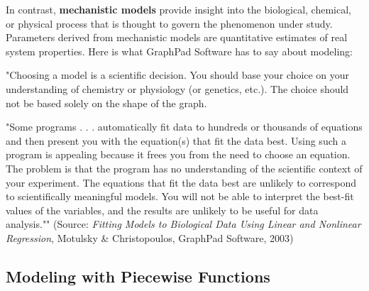 \documentclass[10pt,]{book}
\newcommand{\terminology}[1]{\textbf{#1}}
\theoremstyle{plain}
\theoremstyle{definition}
\theoremstyle{definition}
\theoremstyle{definition}
\theoremstyle{definition}
\theoremstyle{definition}
\numberwithin{equation}{section}
\begin{document}
    In contrast, \terminology{mechanistic models} provide insight into the biological, chemical, or physical process that is thought to govern the phenomenon under study. Parameters derived from mechanistic models are quantitative estimates of real system properties. Here is what GraphPad Software has to say about modeling:
%
\par

    "Choosing a model is a scientific decision. You should base your choice on your understanding of chemistry or physiology (or genetics, etc.). The choice should not be based solely on the shape of the graph.
%
\par

    "Some programs . . . automatically fit data to hundreds or thousands of equations and then present you with the equation(s) that fit the data best. Using such a program is appealing because it frees you from the need to choose an equation. The problem is that the program has no understanding of the scientific context of your experiment. The equations that fit the data best are unlikely to correspond to scientifically meaningful models. You will not be able to interpret the best-fit values of the variables, and the results are unlikely to be useful for data analysis."" (Source: \emph{Fitting Models to Biological Data Using Linear and Nonlinear Regression}, Motulsky \& Christopoulos, GraphPad Software, 2003)
%
\typeout{************************************************}
\typeout{************************************************}
\subsection[Modeling with Piecewise Functions]{Modeling with Piecewise Functions}\label{subsection-47}
\end{document}
